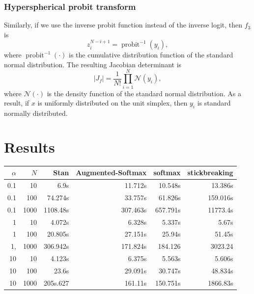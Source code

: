 \documentclass[11pt]{article}
\begin{document}
\subsubsection{Hyperspherical probit transform}

Similarly, if we use the inverse probit function instead of the inverse logit, then $f_3$ is
$$z_i^{N-i+1} = \operatorname{probit}^{-1} (y_i),$$
where $\operatorname{probit}^{-1}(\cdot)$ is the cumulative distribution function of the standard normal distribution.
The resulting Jacobian determinant is
\[
|J_f| = \frac{1}{N!} \prod_{i=1}^N \mathcal{N}(y_i),
\]
where $\mathcal{N}(\cdot)$ is the density function of the standard normal distribution.
As a result, if $x$ is uniformly distributed on the unit simplex, then $y_i$ is standard normally distributed.

\section{Results}

\begin{table}[!ht]
    \centering
    \begin{tabular}{r|r|r|r|r|r|}
    \hline
        $\alpha$ & $N$ & Stan & Augmented-Softmax & softmax & stickbreaking \\ \hline
        0.1 & 10  & 6.9s & 11.712s & 10.548s & 13.386s \\ 
        0.1 & 100 & 74.274s & 33.757s & 61.826s & 159.016s \\ 
        0.1 & 1000 & 1108.48s & 307.463s & 657.791s & 11773.4s \\ 
        1 & 10 & 4.072s & 6.328s & 5.337s & 5.67s \\ 
        1 & 100 & 20.805s & 27.151s & 25.94s & 51.45s \\ 
        1, & 1000 & 306.942s & 171.824s & 184.126 & 3023.24 \\ 
        10 & 10 & 4.123s & 6.375s & 5.563s & 5.606s \\ 
        10 & 100 & 23.6s & 29.091s & 30.747s & 48.834s \\ 
        10 & 1000 & 205s.627 & 161.11s & 150.751s & 1866.83s \\ \hline
    \end{tabular}
\end{table}
\end{document}
